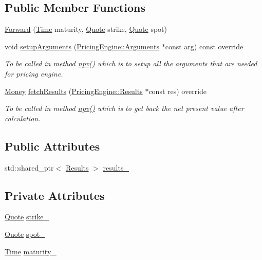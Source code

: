 \subsection*{Public Member Functions}
\begin{DoxyCompactItemize}
\item 
\hyperlink{class_forward_a7ec14e1a089290cae0e70c4cddd353b5}{Forward} (\hyperlink{_name_def_8h_ac2d3e0ba793497bcca555c7c2cf64ff3}{Time} maturity, \hyperlink{_name_def_8h_a642a6c5fd87319d922637de0e0bb0305}{Quote} strike, \hyperlink{_name_def_8h_a642a6c5fd87319d922637de0e0bb0305}{Quote} spot)
\item 
void \hyperlink{class_forward_a909ab0cefa0ab42bdaf3bf6e84ac0096}{setup\+Arguments} (\hyperlink{class_pricing_engine_1_1_arguments}{Pricing\+Engine\+::\+Arguments} $\ast$const arg) const override
\begin{DoxyCompactList}\small\item\em To be called in method \hyperlink{class_instrument_aa750f2ae95a21d65a073da3171e8d084}{npv()} which is to setup all the arguments that are needed for pricing engine. \end{DoxyCompactList}\item 
\hyperlink{_name_def_8h_a5a9d48c16a694e9a2d9f1eca730dc8c5}{Money} \hyperlink{class_forward_ab1e2edeb8345c8605013634a598d1ae5}{fetch\+Results} (\hyperlink{class_pricing_engine_1_1_results}{Pricing\+Engine\+::\+Results} $\ast$const res) override
\begin{DoxyCompactList}\small\item\em To be called in method \hyperlink{class_instrument_aa750f2ae95a21d65a073da3171e8d084}{npv()} which is to get back the net present value after calculation. \end{DoxyCompactList}\end{DoxyCompactItemize}
\subsection*{Public Attributes}
\begin{DoxyCompactItemize}
\item 
std\+::shared\+\_\+ptr$<$ \hyperlink{class_forward_1_1_results}{Results} $>$ \hyperlink{class_forward_abead12e748980177fb67f98bcffbf817}{results\+\_\+}
\end{DoxyCompactItemize}
\subsection*{Private Attributes}
\begin{DoxyCompactItemize}
\item 
\hyperlink{_name_def_8h_a642a6c5fd87319d922637de0e0bb0305}{Quote} \hyperlink{class_forward_a17c32d0a673c13fd92288b1720a43b76}{strike\+\_\+}
\item 
\hyperlink{_name_def_8h_a642a6c5fd87319d922637de0e0bb0305}{Quote} \hyperlink{class_forward_a362d0396ceda462e504f77120339f8b0}{spot\+\_\+}
\item 
\hyperlink{_name_def_8h_ac2d3e0ba793497bcca555c7c2cf64ff3}{Time} \hyperlink{class_forward_ad599104a13c33fbf31e9214af904e9aa}{maturity\+\_\+}
\end{DoxyCompactItemize}
